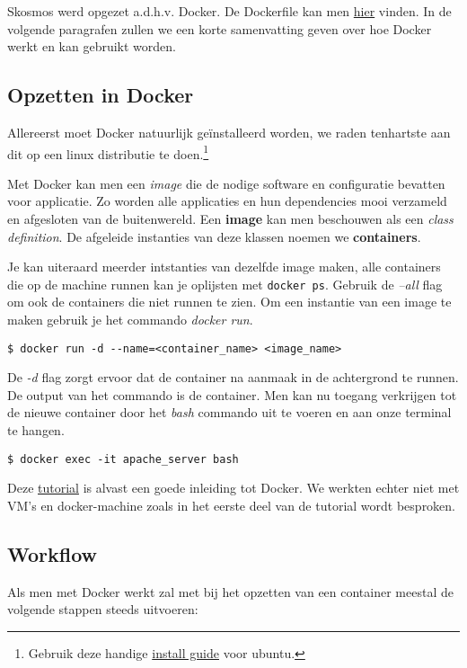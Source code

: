 Skosmos werd opgezet a.d.h.v. Docker. De Dockerfile kan men \href{https://github.com/lab9k/Skos/blob/master/Dockerfile}{hier} vinden. In de volgende paragrafen zullen we een korte samenvatting geven over hoe Docker werkt en kan gebruikt worden.

\subsection{Opzetten in Docker}
Allereerst moet Docker natuurlijk geïnstalleerd worden, we raden tenhartste aan dit op een linux distributie te doen.\footnote{Gebruik deze handige  \href{https://docs.docker.com/install/linux/docker-ce/ubuntu/}{install guide} voor ubuntu.}

Met Docker kan men een \textit{image} die de nodige software en configuratie bevatten voor applicatie. Zo worden alle applicaties en hun dependencies mooi verzameld en afgesloten van de buitenwereld. Een \textbf{image} kan men beschouwen als een \textit{class definition}. De afgeleide instanties van deze klassen noemen we \textbf{containers}.

Je kan uiteraard meerder intstanties van dezelfde image maken, alle containers die op de machine runnen kan je oplijsten met \texttt{docker ps}. Gebruik de \textit{--all} flag om ook de containers die niet runnen te zien. Om een instantie van een image te maken gebruik je het commando \textit{docker run}.

\begin{verbatim}
$ docker run -d --name=<container_name> <image_name>
\end{verbatim}

De \textit{-d} flag zorgt ervoor dat de container na aanmaak in de achtergrond te runnen. De output van het commando is de container. Men kan nu toegang verkrijgen tot de nieuwe container door het \textit{bash} commando uit te voeren en aan onze terminal te hangen.

\begin{verbatim}
$ docker exec -it apache_server bash
\end{verbatim}


Deze \href{https://semaphoreci.com/community/tutorials/dockerizing-a-php-application}{tutorial} is alvast een goede inleiding tot Docker. We werkten echter niet met VM's en docker-machine zoals in het eerste deel van de tutorial wordt besproken. 

\subsection{Workflow}
Als men met Docker werkt zal met bij het opzetten van een container meestal de volgende stappen steeds uitvoeren:


